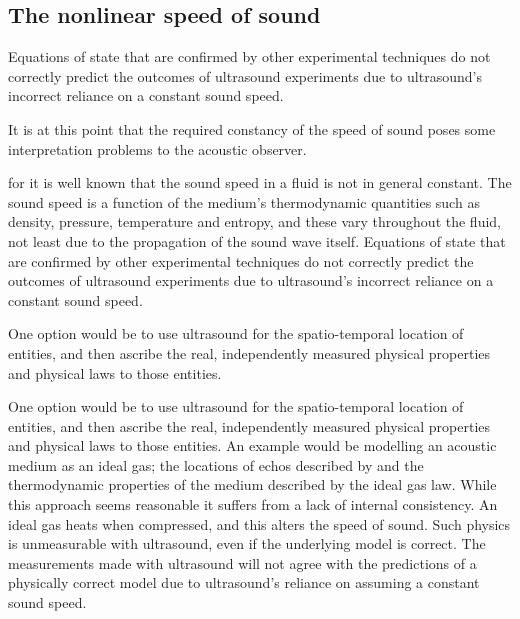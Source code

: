 \subsection{The nonlinear speed of sound}





Equations of state that are confirmed by other experimental techniques do not correctly predict the outcomes of ultrasound experiments
due to ultrasound's incorrect reliance on a constant sound speed.


It is at this point that the required constancy of the speed of sound poses some interpretation problems to the acoustic observer.




for it is well known that the sound speed in a fluid is not in general constant.
The sound speed is a function of the medium's thermodynamic quantities such as  density, pressure, temperature and entropy,
and these vary throughout the fluid, not least due to the propagation of the sound wave itself.
Equations of state that are confirmed by other experimental techniques do not correctly predict the outcomes of ultrasound experiments
due to ultrasound's incorrect reliance on a constant sound speed.






One option would be to use ultrasound for the spatio-temporal location of entities, and then ascribe the real, independently measured physical properties and physical laws to those entities.



One option would be to use ultrasound for the spatio-temporal location of entities, and then ascribe the real, independently measured physical properties and physical laws to those entities.
An example would be modelling an acoustic medium as an ideal gas; the locations of echos described by  and the thermodynamic properties of the medium described by the ideal gas law.
While this approach seems reasonable it suffers from a lack of internal consistency. 
An ideal gas heats when compressed, and this alters the speed of sound.  
Such physics is unmeasurable with ultrasound, even if the underlying model is correct.
The measurements made with ultrasound will not agree with the predictions of a physically correct model due to ultrasound's reliance on assuming a constant sound speed.


